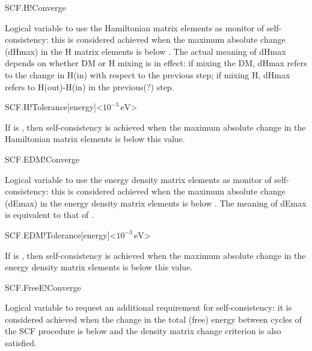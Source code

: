 \begin{fdflogicalT}{SCF.H!Converge}

  Logical variable to use the Hamiltonian matrix elements as monitor
  of self-consistency: this is considered achieved when the maximum
  absolute change (dHmax) in the H matrix elements is below
  . The actual meaning of dHmax depends on
  whether DM or H mixing is in effect: if mixing the DM, dHmax refers
  to the change in H(in) with respect to the previous step; if mixing
  H, dHmax refers to H(out)-H(in) in the previous(?) step. 
  
\end{fdflogicalT}

\begin{fdfentry}{SCF.H!Tolerance}[energy]<$10^{-3}\,\mathrm{eV}$>

  If  is \fdftrue, then self-consistency is
  achieved when the maximum absolute change in the Hamiltonian matrix
  elements is below this value.
  
\end{fdfentry}


\begin{fdflogicalT}{SCF.EDM!Converge}

  Logical variable to use the energy density matrix elements as monitor
  of self-consistency: this is considered achieved when the maximum
  absolute change (dEmax) in the energy density matrix elements is below
  . The meaning of dEmax is equivalent to that
  of .
  
\end{fdflogicalT}

\begin{fdfentry}{SCF.EDM!Tolerance}[energy]<$10^{-3}\,\mathrm{eV}$>

  If  is \fdftrue, then self-consistency is
  achieved when the maximum absolute change in the energy density
  matrix elements is below this value.
  
\end{fdfentry}


\begin{fdflogicalF}{SCF.FreeE!Converge}

  Logical variable to request an additional requirement for
  self-consistency: it is considered achieved when the change in the
  total (free) energy between cycles of the SCF procedure is below
   and the density matrix change criterion is
  also satisfied.

\end{fdflogicalF}

